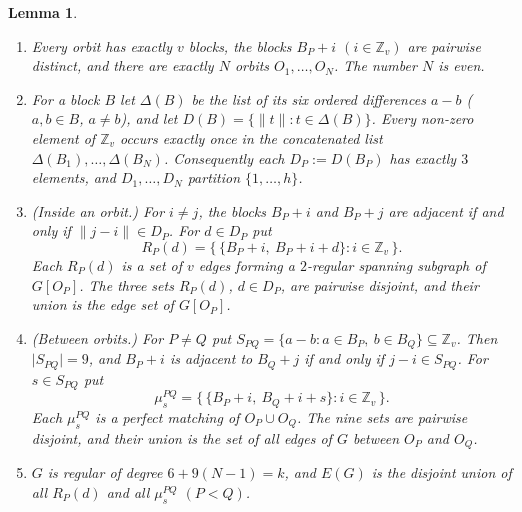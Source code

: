 \documentclass[11pt]{amsart}
\theoremstyle{plain}
\newcommand{\letteredname}{}
\newtheorem*{letteredinner}{Lemma \letteredname}
\newenvironment{lettered}[1]{\renewcommand{\letteredname}{#1}\begin{letteredinner}}{\end{letteredinner}}
\theoremstyle{definition}
\theoremstyle{remark}
\numberwithin{equation}{section}
\newcommand{\Z}{\mathbb{Z}}
\newcommand{\nrm}[1]{\lVert #1\rVert}
\newcommand{\abs}[1]{\lvert #1\rvert}
\begin{document}
\begin{lettered}{A (orbits, differences, edges)}
\begin{enumerate}
\item Every orbit has exactly \(v\) blocks, the blocks \(B_P+i\) \((i\in\Z_v)\) are pairwise distinct, and there are exactly \(N\) orbits \(O_1,\dots,O_N\). The number \(N\) is even.
\item For a block \(B\) let \(\Delta(B)\) be the list of its six ordered differences \(a-b\) (\(a,b\in B\), \(a\ne b\)), and let \(D(B)=\{\nrm{t} : t\in\Delta(B)\}\). Every non-zero element of \(\Z_v\) occurs exactly once in the concatenated list \(\Delta(B_1),\dots,\Delta(B_N)\). Consequently each \(D_P:=D(B_P)\) has exactly \(3\) elements, and \(D_1,\dots,D_N\) partition \(\{1,\dots,h\}\).
\item (Inside an orbit.) For \(i\ne j\), the blocks \(B_P+i\) and \(B_P+j\) are adjacent if and only if \(\nrm{j-i}\in D_P\). For \(d\in D_P\) put
\[
R_P(d)=\bigl\{\,\{B_P+i,\ B_P+i+d\} : i\in\Z_v\,\bigr\}.
\]
Each \(R_P(d)\) is a set of \(v\) edges forming a \(2\)-regular spanning subgraph of \(G[O_P]\). The three sets \(R_P(d)\), \(d\in D_P\), are pairwise disjoint, and their union is the edge set of \(G[O_P]\).
\item (Between orbits.) For \(P\ne Q\) put \(S_{PQ}=\{a-b : a\in B_P,\ b\in B_Q\}\subseteq\Z_v\). Then \(\abs{S_{PQ}}=9\), and \(B_P+i\) is adjacent to \(B_Q+j\) if and only if \(j-i\in S_{PQ}\). For \(s\in S_{PQ}\) put
\[
\mu^{PQ}_s=\bigl\{\,\{B_P+i,\ B_Q+i+s\} : i\in\Z_v\,\bigr\}.
\]
Each \(\mu^{PQ}_s\) is a perfect matching of \(O_P\cup O_Q\). The nine sets are pairwise disjoint, and their union is the set of all edges of \(G\) between \(O_P\) and \(O_Q\).
\item \(G\) is regular of degree \(6+9(N-1)=k\), and \(E(G)\) is the disjoint union of all \(R_P(d)\) and all \(\mu^{PQ}_s\) \((P<Q)\).
\end{enumerate}
\end{lettered}
\end{document}

